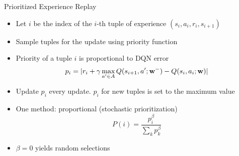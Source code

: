 \documentclass[aspectratio=169]{../latex_main/tntbeamer}  %
\begin{document}
\begin{frame}[c]{Prioritized Experience Replay~}
	
	\begin{itemize}
		\item Let $i$ be the index of the $i$-th tuple of experience $(s_i,a_i,r_i,s_{i+1})$
		\item Sample tuples for the update using priority function
		\item Priority of a tuple $i$ is proportional to DQN error
		$$ p_i = | r_i + \gamma \max_{a' \in A} Q(s_{i+1}, a'; \mathbf{w}^-) - Q(s_i,a_i;\mathbf{w}) |$$
		\item Update $p_i$ every update. $p_i$ for new tuples is set to the maximum value
		\item One method: proportional (stochastic prioritization)
		$$ P(i) = \frac{p_i^\beta}{\sum_k p_k^\beta}$$
		\item $\beta = 0$ yields random selections 
	\end{itemize}
	
\end{frame}
\end{document}
